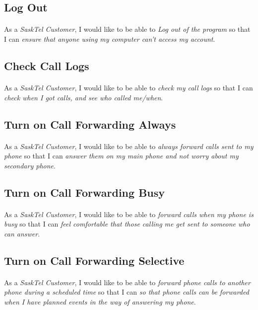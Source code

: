 \documentclass[12pt]{article}
\begin{document}
\subsection{Log Out}
\paragraph{}	As a \textit{SaskTel Customer}, I would like to be able to \textit{Log out of the program} so that I can \textit{ensure that anyone using my computer can't access my account}.

\subsection{Check Call Logs}
\paragraph{}	As a \textit{SaskTel Customer}, I would like to be able to \textit{check my call logs} so that I can \textit{check when I got calls, and see who called me/when}.

\subsection{Turn on Call Forwarding Always}
\paragraph{}	As a \textit{SaskTel Customer}, I would like to be able to \textit{always forward calls sent to my phone} so that I can \textit{answer them on my main phone and not worry about my secondary phone}.

\subsection{Turn on Call Forwarding Busy}
\paragraph{}	As a \textit{SaskTel Customer}, I would like to be able to \textit{forward calls when my phone is busy} so that I can \textit{feel comfortable that those calling me get sent to someone who can answer}.

\subsection{Turn on Call Forwarding Selective}
\paragraph{}	As a \textit{SaskTel Customer}, I would like to be able to \textit{forward phone calls to another phone during a scheduled time} so that I can \textit{so that phone calls can be forwarded when I have planned events in the way of answering my phone}.
\end{document}
